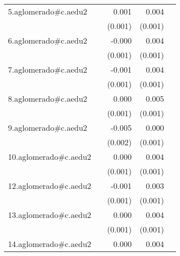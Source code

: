 {\begin{longtable}{l*{4}{D{.}{.}{-1}}}
\addlinespace
5.aglomerado#c.aedu2&                     &       0.001         &       0.004\sym{***}&                     \\
            &                     &     (0.001)         &     (0.001)         &                     \\
\addlinespace
6.aglomerado#c.aedu2&                     &      -0.000         &       0.004\sym{***}&                     \\
            &                     &     (0.001)         &     (0.001)         &                     \\
\addlinespace
7.aglomerado#c.aedu2&                     &      -0.001         &       0.004\sym{***}&                     \\
            &                     &     (0.001)         &     (0.001)         &                     \\
\addlinespace
8.aglomerado#c.aedu2&                     &       0.000         &       0.005\sym{***}&                     \\
            &                     &     (0.001)         &     (0.001)         &                     \\
\addlinespace
9.aglomerado#c.aedu2&                     &      -0.005\sym{**} &       0.000         &                     \\
            &                     &     (0.002)         &     (0.001)         &                     \\
\addlinespace
10.aglomerado#c.aedu2&                     &       0.000         &       0.004\sym{***}&                     \\
            &                     &     (0.001)         &     (0.001)         &                     \\
\addlinespace
12.aglomerado#c.aedu2&                     &      -0.001         &       0.003\sym{**} &                     \\
            &                     &     (0.001)         &     (0.001)         &                     \\
\addlinespace
13.aglomerado#c.aedu2&                     &       0.000         &       0.004\sym{***}&                     \\
            &                     &     (0.001)         &     (0.001)         &                     \\
\addlinespace
14.aglomerado#c.aedu2&                     &       0.000         &       0.004\sym{***}&                     \\

\end{longtable}}
